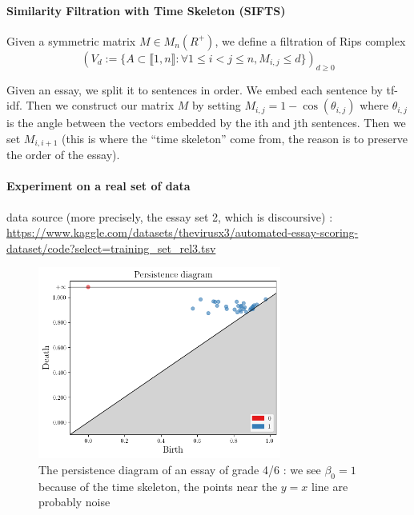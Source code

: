 \paragraph{Similarity Filtration with Time Skeleton (SIFTS) \cite{Zhu_2013}}

\begin{definition}
  Given a symmetric matrix $M \in M_n(R^+)$, we define a filtration of Rips complex
  $$
  (V_d := \{A \subset \llbracket 1, n\rrbracket :
  \forall 1\le i<j\le n, M_{i, j} \le d\})_{d\ge 0}
  $$
\end{definition}

Given an essay, we split it to sentences in order. We embed each sentence by tf-idf.
Then we construct our matrix $M$ by setting $M_{i, j} = 1-\cos(\theta_{i,j})$ where
$\theta_{i, j}$ is the angle between the vectors embedded by the ith and jth sentences.
Then we set $M_{i, i+1}$ (this is where the ``time skeleton'' come from, the reason is
to preserve the order of the essay).

\paragraph{Experiment on a real set of data}

data source (more precisely, the essay set 2, which is discoursive) :
\url{https://www.kaggle.com/datasets/thevirusx3/automated-essay-scoring-dataset/code?select=training_set_rel3.tsv}

\begin{figure}[htbp]
\centering
\includegraphics[width=8cm]{pdessay.png}
\caption{The persistence diagram of an essay of grade 4/6 :
we see $\beta_0 = 1$ because of the time skeleton, the points near the $y=x$ line
are probably noise}
\label{fig:pd}
\end{figure}

